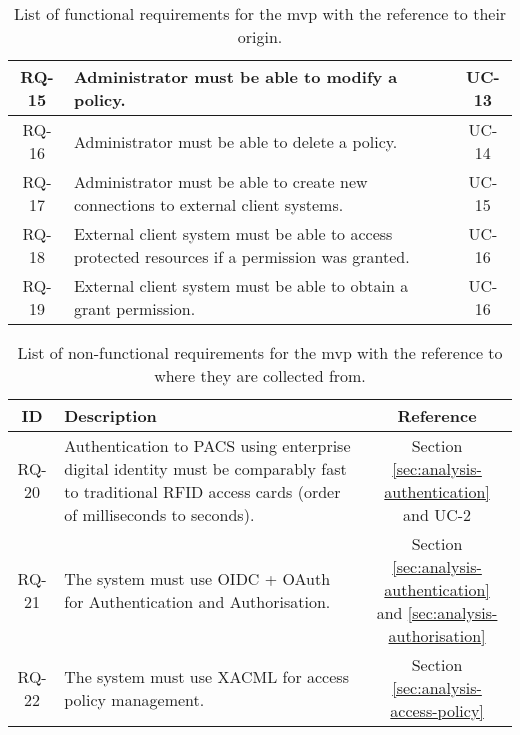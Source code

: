 \begin{table}[htbp!]
\begin{tabular}{|c|p{15cm}|c|}
    \hline
    RQ-15&Administrator must be able to modify a policy.&UC-13\\
    \hline
    RQ-16&Administrator must be able to delete a policy.&UC-14\\
    \hline
    \hline
    RQ-17&Administrator must be able to create new connections to external client systems.&UC-15\\
    \hline
    \hline
    RQ-18&External client system must be able to access protected resources if a permission was granted.&UC-16\\
    \hline
    RQ-19&External client system must be able to obtain a grant permission.&UC-16\\
    \hline
    \end{tabular}
    \caption{List of functional requirements for the \acrshort{mvp} with the reference to their origin.}
    \label{tab:functional-requirements}
\end{table}
% 
\begin{table}[htbp!]
    \footnotesize
    \onehalfspacing
    \centering
    \begin{tabular}{|c|p{15cm}|c|}
    \hline
    \cellcolor[HTML]{CBCEFB}\textbf{ID}&\cellcolor[HTML]{CBCEFB}\textbf{Description}&\cellcolor[HTML]{CBCEFB}\textbf{Reference}\\
    \hline
    RQ-20&Authentication to PACS using enterprise digital identity must be comparably fast to traditional RFID access cards (order of milliseconds to seconds).&\makecell{Section \ref{sec:analysis-authentication} \\ and UC-2}\\
    \hline
    RQ-21&The system must use OIDC + OAuth for Authentication and Authorisation.&\makecell{Section \ref{sec:analysis-authentication} \\ and \ref{sec:analysis-authorisation}}\\
    \hline
    RQ-22&The system must use XACML for access policy management.&Section \ref{sec:analysis-access-policy}\\
    \hline
    \end{tabular}
    \caption{List of non-functional requirements for the \acrshort{mvp} with the reference to where they are collected from.}
    \label{tab:nonfunctional-requirements}
\end{table}